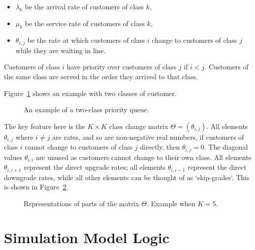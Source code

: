 \documentclass{article}
\begin{document}
\begin{itemize}
  \item $\lambda_k$ be the arrival rate of customers of class $k$,
  \item $\mu_k$ be the service rate of customers of class $k$,
  \item $\theta_{i,j}$ be the rate at which customers of class $i$ change
  to customers of class $j$ while they are waiting in line.
\end{itemize}

Customers of class $i$ have priority over customers of class $j$ if $i < j$.
Customers of the same class are served in the order they arrived to that class.

Figure~\ref{fig:twoclass_example} shows an example with two classes of customer.

\begin{figure}
\begin{center}

\end{center}
\caption{An example of a two-class priority queue.}
\label{fig:twoclass_example}
\end{figure}

The key feature here is the $K \times K$ class change matrix
$\Theta = (\theta_{i,j})$. All elements $\theta_{i,j}$ where $i \neq j$ are
rates, and so are non-negative real numbers, if customers of class $i$ cannot
change to customers of class $j$ directly, then $\theta_{i,j} = 0$. The diagonal
values $\theta_{i,i}$ are unused as customers cannot change to their own class.
All elements $\theta_{i,i+1}$ represent the direct upgrade rates; all elements
$\theta_{i,i-1}$ represent the direct downgrade rates, while all other elements
can be thought of as `skip-grades`.
This is shown in Figure~\ref{fig:skipgrades}.

\begin{figure}
\begin{center}

\end{center}
\caption{Representations of parts of the matrix $\Theta$. Example when $K=5$.}
\label{fig:skipgrades}
\end{figure}


\section{Simulation Model Logic}
\end{document}
